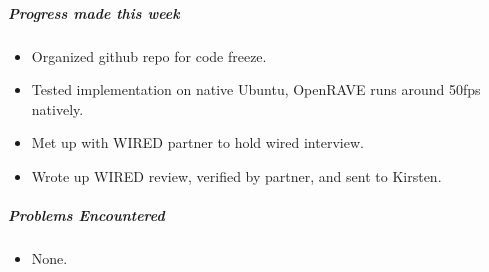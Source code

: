 {\subparagraph{Progress made this week}
\begin{itemize}
  \item Organized github repo for code freeze.
  \item Tested implementation on native Ubuntu, OpenRAVE runs around 50fps natively.
  \item Met up with WIRED partner to hold wired interview.
  \item Wrote up WIRED review, verified by partner, and sent to Kirsten.
\end{itemize}

\subparagraph{Problems Encountered}
\begin{itemize}
  \item None.
\end{itemize}

}

\newpage

